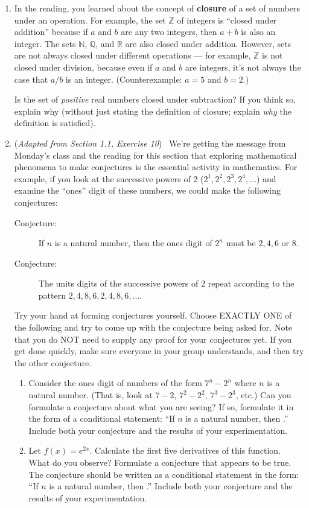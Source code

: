 \documentclass[11pt]{article}
\begin{document}
\begin{enumerate}
	\item In the reading, you learned about the concept of \textbf{closure} of a set of numbers under an operation. For example, the set $\mathbb{Z}$ of integers is ``closed under addition'' because if $a$ and $b$ are any two integers, then $a+b$ is also an integer. The sets $\mathbb{N}$, $\mathbb{Q}$, and $\mathbb{R}$ are also closed under addition. However, sets are not always closed under different operations --- for example, $\mathbb{Z}$ is not closed under division, because even if $a$ and $b$ are integers, it's not always the case that $a/b$ is an integer. (Counterexample: $a=5$ and $b=2$.) 
	
Is the set of \emph{positive} real numbers closed under subtraction? If you think so, explain why (without just stating the definition of closure; explain \emph{why} the definition is satisfied). 
	
	
	\item (\emph{Adapted from Section 1.1, Exercise 10}) \  We're getting the message from Monday's class and the reading for this section that exploring mathematical phenomena to make conjectures is the essential activity in mathematics. For example, if you look at the successive powers of 2 ($2^1, 2^2, 2^3, 2^4, \dots$) and examine the ``ones'' digit of these numbers, we could make the following conjectures: 
	\begin{description}
		\item[Conjecture:] If $n$ is a natural number, then the ones digit of $2^n$ must be $2,4,6$ or $8.$
		\item[Conjecture:] The units digits of the successive powers of $2$ repeat according to the pattern $2,4,8,6,2,4,8,6,\dots$. 
	\end{description}
Try your hand at forming conjectures yourself. Choose EXACTLY ONE of the following and try to come up with the conjecture being asked for. Note that you do NOT need to supply any proof for your conjectures yet. If you get done quickly, make sure everyone in your group understands, and then try the other conjecture. 
	\begin{enumerate}
		\item Consider the ones digit of numbers of the form $7^n - 2^n$ where $n$ is a natural number. (That is, look at $7-2$, $7^2 - 2^2$, $7^3 - 2^3$, etc.) Can you formulate a conjecture about what you are seeing? If so, formulate it in the form of a conditional statement: ``If $n$ is a natural number, then \underline{\hspace{0.3in}}.'' Include both your conjecture and the results of your experimentation. 
		\item Let $f(x) = e^{2x}$. Calculate the first five derivatives of this function. What do you observe? Formulate a conjecture that appears to be true. The conjecture should be written as a conditional statement in the form: ``If $n$ is a natural number, then \underline{\hspace{0.3in}}.'' Include both your conjecture and the results of your experimentation. 
	\end{enumerate}
	
\end{enumerate}
\end{document}
